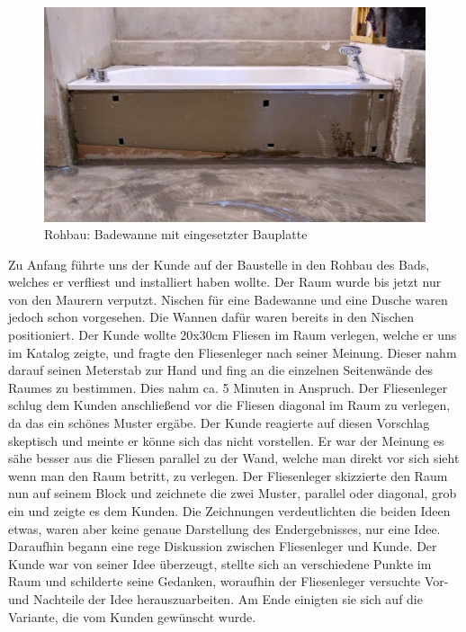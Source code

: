 \begin{figure}[h]
	\begin{center}
		\noindent\includegraphics[scale=0.1]{Resources/Praktikum/IMG_20180801_090144_HDR.jpg}
		\caption{Rohbau: Badewanne mit eingesetzter Bauplatte}	
	\end{center}
\end{figure}

Zu Anfang führte uns der Kunde auf der Baustelle in den Rohbau des Bads, welches er verfliest und installiert haben wollte. Der Raum wurde bis jetzt nur von den Maurern verputzt. Nischen für eine Badewanne und eine Dusche waren jedoch schon vorgesehen. Die Wannen dafür waren bereits in den Nischen positioniert. Der Kunde wollte 20x30cm Fliesen im Raum verlegen, welche er uns im Katalog zeigte, und fragte den Fliesenleger nach seiner Meinung. Dieser nahm darauf seinen Meterstab zur Hand und fing an die einzelnen Seitenwände des Raumes zu bestimmen. Dies nahm ca. 5 Minuten in Anspruch. Der Fliesenleger schlug dem Kunden anschließend vor die Fliesen diagonal im Raum zu verlegen, da das ein schönes Muster ergäbe. Der Kunde reagierte auf diesen Vorschlag skeptisch und meinte er könne sich das nicht vorstellen. Er war der Meinung es sähe besser aus die Fliesen parallel zu der Wand, welche man direkt vor sich sieht wenn man den Raum betritt, zu verlegen. Der Fliesenleger skizzierte den Raum nun auf seinem Block und zeichnete die zwei Muster, parallel oder diagonal, grob ein und zeigte es dem Kunden. Die Zeichnungen verdeutlichten die beiden Ideen etwas, waren aber keine genaue Darstellung des Endergebnisses, nur eine Idee. Daraufhin begann eine rege Diskussion zwischen Fliesenleger und Kunde. Der Kunde war von seiner Idee überzeugt, stellte sich an verschiedene Punkte im Raum und schilderte seine Gedanken, woraufhin der Fliesenleger versuchte Vor- und Nachteile der Idee herauszuarbeiten. Am Ende einigten sie sich auf die Variante, die vom Kunden gewünscht wurde.

